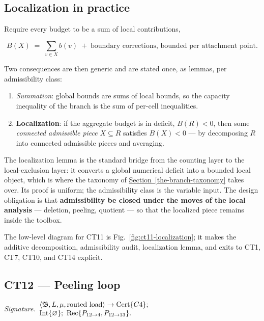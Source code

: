 \documentclass[
  11pt,
]{article}
\providecommand{\tightlist}{%
  \setlength{\itemsep}{0pt}\setlength{\parskip}{0pt}}
\theoremstyle{definition}
\newcommand{\secref}[1]{\hyperref[#1]{Section~\ref*{#1}}}
\newcommand{\ctsignature}[1]{\par\noindent\emph{Signature.}\ #1\par\medskip}
\newcommand{\ctcert}[1]{\mathrm{Cert}\{#1\}}
\newcommand{\ctint}[1]{\mathrm{Int}\{#1\}}
\newcommand{\ctrec}[1]{\mathrm{Rec}\{#1\}}
\newcommand{\ctnone}{\varnothing}
\begin{document}
\subsection*{Localization in practice}

Require every budget to be a sum of local contributions,

\[
B(X)\;=\;\sum_{v\in X} b(v)\;+\;\text{boundary corrections, bounded per attachment point.}
\]

Two consequences are then generic and are stated once, as lemmas, per
admissibility class:

\begin{enumerate}
\def\labelenumi{\arabic{enumi}.}
\tightlist
\item
  \emph{Summation}: global bounds are sums of local bounds, so the
  capacity inequality of the branch is the sum of per-cell inequalities.
\item
  \textbf{Localization}: if the aggregate budget is in deficit,
  \(B(R)<0\), then some \emph{connected admissible piece}
  \(X\subseteq R\) satisfies \(B(X)<0\) --- by decomposing \(R\) into
  connected admissible pieces and averaging.
\end{enumerate}

The localization lemma is the standard bridge from the counting layer to
the local-exclusion layer: it converts a global numerical deficit into a
bounded local object, which is where the taxonomy of \secref{the-branch-taxonomy} takes
over. Its proof is uniform; the admissibility class is the variable
input. The design obligation is that \textbf{admissibility be closed
under the moves of the local analysis} --- deletion, peeling, quotient
--- so that the localized piece remains inside the toolbox.

The low-level diagram for CT11 is Fig.~\ref{fig:ct11-localization};
it makes the additive decomposition, admissibility audit,
localization lemma, and exits to CT1, CT7, CT10, and CT14 explicit.



\subsection{CT12 --- Peeling loop}\label{ct:12}\label{peeling-loops-closure-by-well-founded-recursion}
\ctsignature{\(\begin{array}{@{}l@{}}
\langle\mathfrak B,L,\mu,\text{routed load}\rangle\to\ctcert{C4};\\
\ctint{\ctnone};\ \ctrec{P_{12\to4},P_{12\to13}}.
\end{array}\)}
\end{document}
